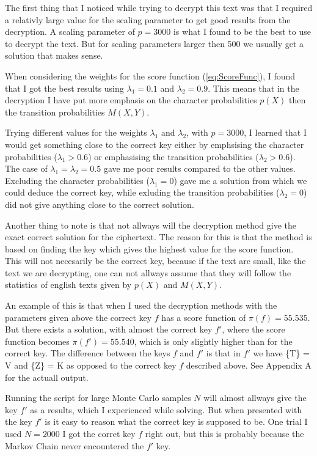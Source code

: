 \documentclass[a4paper, 11pt]{article}
\begin{document}
The first thing that I noticed while trying to decrypt this text was that I
required a relativly large value for the scaling parameter to get good results
from the decryption. A scaling parameter of $p = 3000$ is what I found to
be the best to use to decrypt the text. But for scaling parameters larger then
500 we usually get a solution that makes sense.

When considering the weights for the score function (\ref{eq:ScoreFunc}), I 
found that I got the best results using $\lambda_1 = 0.1$ and 
$\lambda_2 = 0.9$. This means that in the decryption I have put more emphasis 
on the character probabilities $p(X)$ then the transition probabilities 
$M(X,Y)$.

Trying different values for the weights $\lambda_1$ and $\lambda_2$,
with $p = 3000$, I learned that I would get something
close to the correct key either by emphsising the character probabilities
($\lambda_1 > 0.6$) or emphasising the transition probabilities 
($\lambda_2 > 0.6$). The case of $\lambda_1 = \lambda_2 = 0.5$ gave me 
poor results compared to the other values. Excluding the character
probabilities ($\lambda_1 = 0$) gave me a solution from which we could
deduce the correct key, while exluding the transition probabilities
($\lambda_2 = 0$) did not give anything close to the correct solution.

Another thing to note is that not allways will the decryption method give
the exact correct solution for the ciphertext. The reason for this is that
the method is based on finding the key which gives the highest value for 
the score function. This will not necesarily be the correct key, because 
if the text are small, like the text we are decrypting, one can not allways
assume that they will follow the statistics of english texts given by
$p(X)$ and $M(X,Y)$.

An example of this is that when I used the decryption methods with the
parameters given above the correct key $f$ has a score function of 
$\pi(f) = 55.535$. But there exists a solution, with almost the correct
key $f'$, where the score function becomes $\pi(f') = 55.540$, which is only
slightly higher than for the correct key. The difference between the keys
$f$ and $f'$ is that in $f'$ we have \{T\} = V and \{Z\} = K as opposed to
the correct key $f$ described above. See Appendix A for the actuall output.

Running the script for large Monte Carlo samples $N$ will almost allways give
the key $f'$ as a results, which I experienced while solving. But when 
presented with the key $f'$ is it easy to reason what the correct key
is supposed to be. One trial I used $N = 2000$ I got the corret key $f$ right 
out, but this is probably because the Markov Chain never encountered the $f'$
key.
\end{document}
